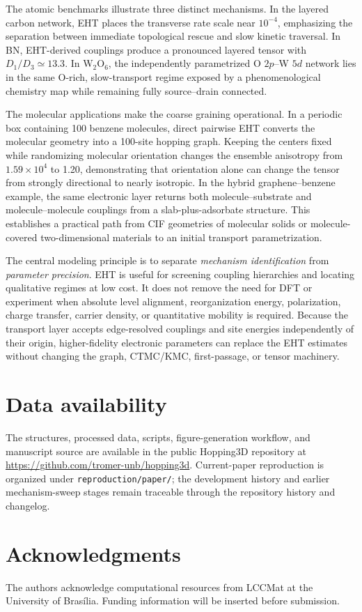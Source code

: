 \documentclass[aps,prmaterials,reprint,amsmath,amssymb,superscriptaddress,longbibliography]{revtex4-2}
\begin{document}
The atomic benchmarks illustrate three distinct mechanisms. In the layered carbon network, EHT places the transverse rate scale near $10^{-4}$, emphasizing the separation between immediate topological rescue and slow kinetic traversal. In BN, EHT-derived couplings produce a pronounced layered tensor with $D_1/D_3\simeq13.3$. In W$_2$O$_6$, the independently parametrized O $2p$--W $5d$ network lies in the same O-rich, slow-transport regime exposed by a phenomenological chemistry map while remaining fully source--drain connected.

The molecular applications make the coarse graining operational. In a periodic box containing 100 benzene molecules, direct pairwise EHT converts the molecular geometry into a 100-site hopping graph. Keeping the centers fixed while randomizing molecular orientation changes the ensemble anisotropy from $1.59\times10^4$ to 1.20, demonstrating that orientation alone can change the tensor from strongly directional to nearly isotropic. In the hybrid graphene--benzene example, the same electronic layer returns both molecule--substrate and molecule--molecule couplings from a slab-plus-adsorbate structure. This establishes a practical path from CIF geometries of molecular solids or molecule-covered two-dimensional materials to an initial transport parametrization.

The central modeling principle is to separate \emph{mechanism identification} from \emph{parameter precision}. EHT is useful for screening coupling hierarchies and locating qualitative regimes at low cost. It does not remove the need for DFT or experiment when absolute level alignment, reorganization energy, polarization, charge transfer, carrier density, or quantitative mobility is required. Because the transport layer accepts edge-resolved couplings and site energies independently of their origin, higher-fidelity electronic parameters can replace the EHT estimates without changing the graph, CTMC/KMC, first-passage, or tensor machinery.

\section*{Data availability}
The structures, processed data, scripts, figure-generation workflow, and manuscript source are available in the public Hopping3D repository at \url{https://github.com/tromer-unb/hopping3d}. Current-paper reproduction is organized under \texttt{reproduction/paper/}; the development history and earlier mechanism-sweep stages remain traceable through the repository history and changelog.

\section*{Acknowledgments}
The authors acknowledge computational resources from LCCMat at the University of Bras\'ilia. Funding information will be inserted before submission.


\end{document}
